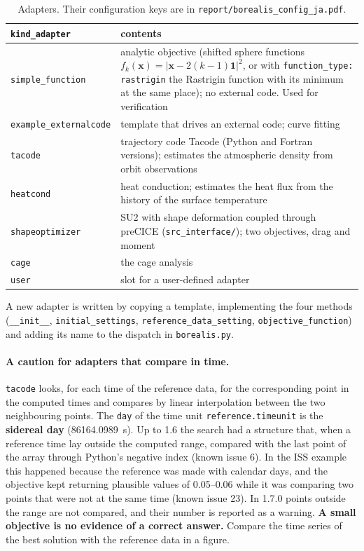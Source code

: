 \documentclass[11pt,a4paper]{article}
\begin{document}
\begin{table}[h]
\centering
\small
\begin{tabularx}{\linewidth}{lX}
\toprule
\texttt{kind\_adapter} & contents \\
\midrule
\texttt{simple\_function} & analytic objective (shifted sphere functions $f_k(\mathbf{x}) = |\mathbf{x} - 2(k-1)\mathbf{1}|^2$, or with \texttt{function\_type: rastrigin} the Rastrigin function with its minimum at the same place); no external code. Used for verification \\
\texttt{example\_externalcode} & template that drives an external code; curve fitting \\
\texttt{tacode} & trajectory code Tacode (Python and Fortran versions); estimates the atmospheric density from orbit observations \cite{takahashi2022,sakai2024} \\
\texttt{heatcond} & heat conduction; estimates the heat flux from the history of the surface temperature \\
\texttt{shapeoptimizer} & SU2 with shape deformation coupled through preCICE (\texttt{src\_interface/}); two objectives, drag and moment \\
\texttt{cage} & the cage analysis \\
\texttt{user} & slot for a user-defined adapter \\
\bottomrule
\end{tabularx}
\caption{Adapters. Their configuration keys are in \texttt{report/borealis\_config\_ja.pdf}.}
\end{table}

A new adapter is written by copying a template, implementing the four methods (\texttt{\_\_init\_\_}, \texttt{initial\_settings}, \texttt{reference\_data\_setting}, \texttt{objective\_function}) and adding its name to the dispatch in \texttt{borealis.py}.

\paragraph{A caution for adapters that compare in time.} \texttt{tacode} looks, for each time of the reference data, for the corresponding point in the computed times and compares by linear interpolation between the two neighbouring points. The \texttt{day} of the time unit \texttt{reference.timeunit} is the \textbf{sidereal day} (86164.0989~s). Up to 1.6 the search had a structure that, when a reference time lay outside the computed range, compared with the last point of the array through Python's negative index (known issue 6). In the ISS example this happened because the reference was made with calendar days, and the objective kept returning plausible values of 0.05--0.06 while it was comparing two points that were not at the same time (known issue 23). In 1.7.0 points outside the range are not compared, and their number is reported as a warning. \textbf{A small objective is no evidence of a correct answer.} Compare the time series of the best solution with the reference data in a figure.
\end{document}
